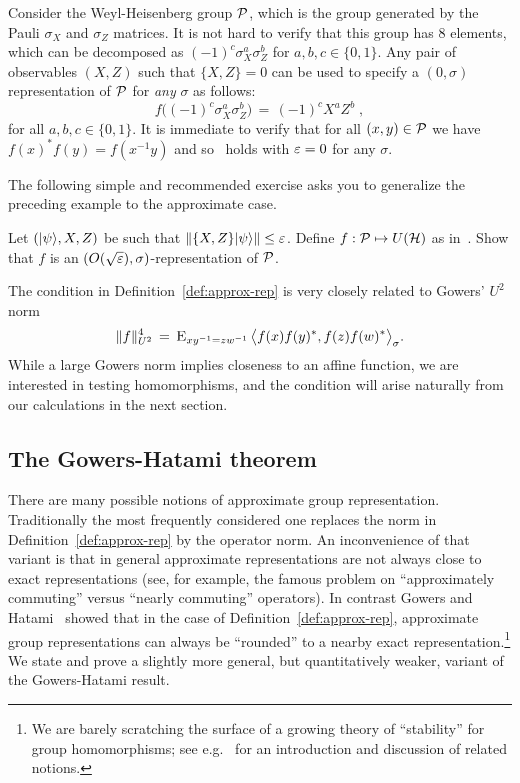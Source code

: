 \begin{example}
\label{example-wh-1}
Consider the Weyl-Heisenberg group $\mathcal{P}$, which is the group generated by the Pauli $\sigma_X$ and $\sigma_Z$ matrices. It is not hard to verify that this group has $8$ elements, which can be decomposed as $(-1)^c \sigma_X^a \sigma_Z^b$ for $a,b,c\in\{0,1\}$. Any pair of observables $(X,Z)$ such that $\{X,Z\}=0$ can be used to specify a $(0,\sigma)$ representation of $\mathcal{P}$ for \emph{any} $\sigma$ as follows:
\begin{equation}
\label{eq:def-rep-pauli}
 f\big((-1)^c \sigma_X^a \sigma_Z^b\big) \,=\, (-1)^c X^a Z^b\;,
\end{equation}
for all $a,b,c\in\{0,1\}$. It is immediate to verify that for all $(x,y)\in \mathcal{P}$ we have $f(x)^*f(y)=f(x^{-1}y)$ and so~ holds with $\varepsilon=0$ for any $\sigma$.
\end{example}

The following simple and recommended exercise asks you to generalize the preceding example to the approximate case. 

\begin{exercise}
\label{ex:wh-2}
Let $(|\psi\rangle,X,Z)$ be such that $\|\{X,Z\}|\psi\rangle\|\leq \varepsilon$. Define $f:\mathcal{P} \mapsto U(\mathcal{H})$ as in~. Show that $f$ is an $(O(\sqrt{\varepsilon}),\sigma)$-representation of $\mathcal{P}$. 
\end{exercise}

\begin{remark}
The condition  in Definition~\ref{def:approx-rep} is very closely related to Gowers' $U^2$ norm
$$\|f\|_{U^2}^4 \,=\, \textsc{E}_{xy^{-1}=zw^{-1}}\, \big\langle f(x)f(y)^* ,f(z)f(w)^* \big\rangle_\sigma.$$
While a large Gowers norm implies closeness to an affine function, we are interested in testing homomorphisms, and the condition  will arise naturally from our calculations in the next section. 
\end{remark}

\subsection{The Gowers-Hatami theorem}
\label{subsection-gowers-hatami-theorem}

There are many possible notions of approximate group representation. Traditionally the most frequently considered one replaces the norm in Definition~\ref{def:approx-rep} by the operator norm. An inconvenience of that variant is that in general approximate representations are not always close to exact representations (see, for example, the famous problem on ``approximately commuting'' versus ``nearly commuting'' operators). In contrast 
Gowers and Hatami~\cite{gowers2017inverse} showed that in the case of Definition~\ref{def:approx-rep}, approximate group representations can always be ``rounded'' to a nearby exact representation.\footnote{We are barely scratching the surface of a growing theory of ``stability'' for group homomorphisms; see e.g.~\cite{becker2020stability} for an introduction and discussion of related notions.} 
We state and prove a slightly more general, but quantitatively weaker, variant of the Gowers-Hatami result.

